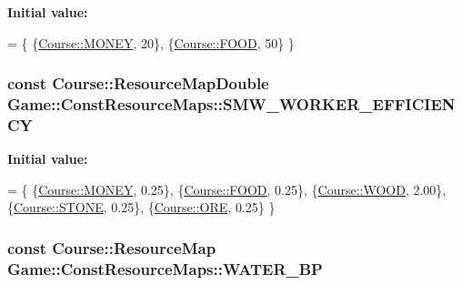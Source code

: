 {\bfseries Initial value\-:}
\begin{DoxyCode}
= \{
    \{\hyperlink{namespaceCourse_a02d49c04029594d4adba79b84bb85f65aff016add6bbbdbb44abf1d2d7f215ec0}{Course::MONEY}, 20\},
    \{\hyperlink{namespaceCourse_a02d49c04029594d4adba79b84bb85f65a7018c47af38bfc1390a89e70b4cf4760}{Course::FOOD}, 50\}
\}
\end{DoxyCode}
\hypertarget{namespaceGame_1_1ConstResourceMaps_aa229959dcf7750d06878db7f5c4d0bae}{
\subsubsection[{S\-M\-W\-\_\-\-W\-O\-R\-K\-E\-R\-\_\-\-E\-F\-F\-I\-C\-I\-E\-N\-C\-Y}]{\setlength{\rightskip}{0pt plus 5cm}const {\bf Course\-::\-Resource\-Map\-Double} Game\-::\-Const\-Resource\-Maps\-::\-S\-M\-W\-\_\-\-W\-O\-R\-K\-E\-R\-\_\-\-E\-F\-F\-I\-C\-I\-E\-N\-C\-Y}}\label{namespaceGame_1_1ConstResourceMaps_aa229959dcf7750d06878db7f5c4d0bae}
{\bfseries Initial value\-:}
\begin{DoxyCode}
= \{
    \{\hyperlink{namespaceCourse_a02d49c04029594d4adba79b84bb85f65aff016add6bbbdbb44abf1d2d7f215ec0}{Course::MONEY}, 0.25\},
    \{\hyperlink{namespaceCourse_a02d49c04029594d4adba79b84bb85f65a7018c47af38bfc1390a89e70b4cf4760}{Course::FOOD}, 0.25\},
    \{\hyperlink{namespaceCourse_a02d49c04029594d4adba79b84bb85f65a87287be3009253b983ffb2e9f91eef22}{Course::WOOD}, 2.00\},
    \{\hyperlink{namespaceCourse_a02d49c04029594d4adba79b84bb85f65a8598c3079c2be7785410e724cc190229}{Course::STONE}, 0.25\},
    \{\hyperlink{namespaceCourse_a02d49c04029594d4adba79b84bb85f65af416a215c7dad21349df38d35be0a1e1}{Course::ORE}, 0.25\}
\}
\end{DoxyCode}
\hypertarget{namespaceGame_1_1ConstResourceMaps_a0a964a6f0f80340d5a2d5a0a8dd0f79a}{
\subsubsection[{W\-A\-T\-E\-R\-\_\-\-B\-P}]{\setlength{\rightskip}{0pt plus 5cm}const {\bf Course\-::\-Resource\-Map} Game\-::\-Const\-Resource\-Maps\-::\-W\-A\-T\-E\-R\-\_\-\-B\-P}}\label{namespaceGame_1_1ConstResourceMaps_a0a964a6f0f80340d5a2d5a0a8dd0f79a}
